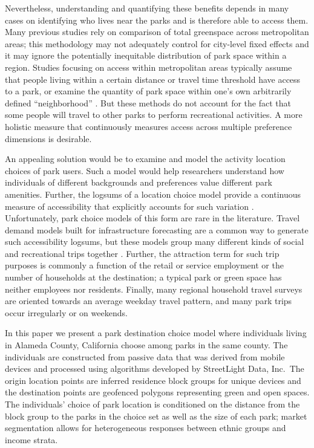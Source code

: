 \documentclass[]{elsarticle} %
\begin{document}
Nevertheless, understanding and quantifying these benefits depends in many
cases on identifying who lives near the parks and is therefore able to access
them. Many previous studies \citep[e.g.,][]{Richardson2012} rely on comparison of total
greenspace across metropolitan areas; this methodology may not adequately
control for city-level fixed effects and it may ignore the potentially
inequitable distribution of park space within a region. Studies focusing on
access within metropolitan areas typically assume that people living within a
certain distance or travel time threshold have access to a park, or examine the
quantity of park space within one's own arbitrarily defined ``neighborhood''
\citep[Stark2014]{Mitchell2008}. But these methods do not account for the fact that
some people will travel to other parks to perform recreational activities. A
more holistic measure that continuously measures access across multiple
preference dimensions is desirable.

An appealing solution would be to examine and model the activity location
choices of park users. Such a model would help researchers understand how
individuals of different backgrounds and preferences value different park
amenities. Further, the logsums of a location choice model provide a continuous
measure of accessibility that explicitly accounts for such variation
\citep{DeJong2007}. Unfortunately, park choice models of this form are rare in the
literature. Travel demand models built for infrastructure forecasting are a
common way to generate such accessibility logsums, but these models group many
different kinds of social and recreational trips together \citep{nchrp716}. Further,
the attraction term for such trip purposes is commonly a function of the retail
or service employment or the number of households at the destination; a typical
park or green space has neither employees nor residents. Finally, many regional
household travel surveys are oriented towards an average weekday travel
pattern, and many park trips occur irregularly or on weekends.

In this paper we present a park destination choice model where individuals
living in Alameda County, California choose among parks in the same county. The
individuals are constructed from passive data that was derived from mobile
devices and processed using algorithms developed by StreetLight Data, Inc.~The
origin location points are inferred residence block groups for unique devices
and the destination points are geofenced polygons representing green and open
spaces. The individuals' choice of park location is conditioned on the distance
from the block group to the parks in the choice set as well as the size of each
park; market segmentation allows for heterogeneous responses between ethnic
groups and income strata.
\end{document}
